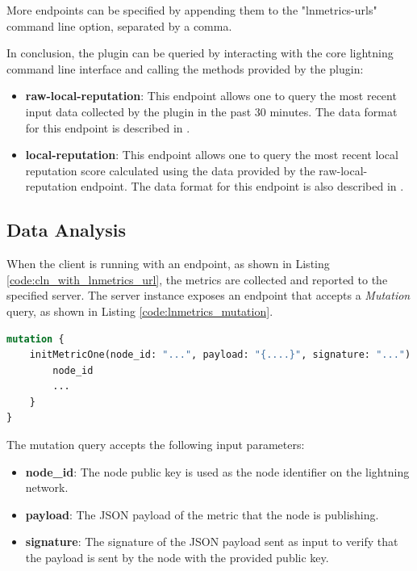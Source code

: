 More endpoints can be specified by appending them to the "lnmetrics-urls" command line option, separated by a comma.

In conclusion, the plugin can be queried by interacting with the core lightning 
command line interface and calling the methods provided by the plugin:

\begin{itemize}
    \item {\bf raw-local-reputation}: This endpoint allows one to query the most recent input data 
        collected by the plugin in the past 30 minutes. The data format for this endpoint 
        is described in \cite{lnmetrics_localreputation}.
    \item {\bf local-reputation}: This endpoint allows one to query the most recent local 
        reputation score calculated using the data provided by the raw-local-reputation 
        endpoint. The data format for this endpoint is also described in \cite{lnmetrics_localreputation}.
\end{itemize}

\subsection{Data Analysis}

When the client is running with an endpoint, as shown in Listing \ref{code:cln_with_lnmetrics_url}, the metrics are 
collected and reported to the specified server. The server instance exposes an endpoint that accepts a \emph{Mutation} 
query, as shown in Listing \ref{code:lnmetrics_mutation}.

\begin{lstlisting}[language=graphql, basicstyle=\small,
                  caption={Mutation query call by the client to initialise the metric on the server.}, 
                  label={code:lnmetrics_mutation}]
mutation {
    initMetricOne(node_id: "...", payload: "{....}", signature: "...") {
        node_id
        ...
    }
}
\end{lstlisting}

The mutation query accepts the following input parameters:

\begin{itemize}
    \item {\bf node\_id}: The node public key is used as the node identifier on the lightning network.
    \item {\bf payload}: The JSON payload of the metric that the node is publishing.
    \item {\bf signature}: The signature of the JSON payload sent as input to verify that the
        payload is sent by the node with the provided public key.
\end{itemize}

